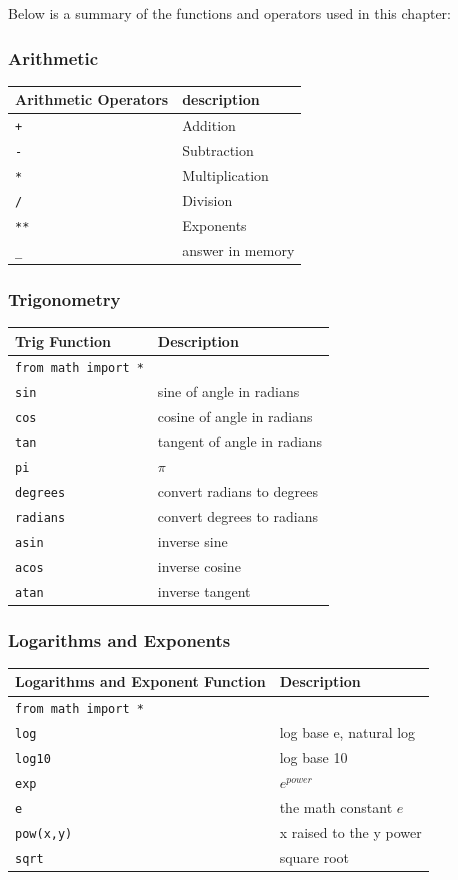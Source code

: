 \documentclass{book}
\begin{document}
Below is a summary of the functions and operators used in this chapter:

\subsubsection{Arithmetic}\label{arithmetic}

\begin{longtable}[]{@{}ll@{}}
\toprule
Arithmetic Operators & description\tabularnewline
\midrule
\endhead
\lstinline!+! & Addition\tabularnewline
\lstinline!-! & Subtraction\tabularnewline
\lstinline!*! & Multiplication\tabularnewline
\lstinline!/! & Division\tabularnewline
\lstinline!**! & Exponents\tabularnewline
\lstinline!_! & answer in memory\tabularnewline
\bottomrule
\end{longtable}

\subsubsection{Trigonometry}\label{trigonometry}

\begin{longtable}[]{@{}ll@{}}
\toprule
Trig Function & Description\tabularnewline
\midrule
\endhead
\lstinline!from math import *! &\tabularnewline
\lstinline!sin! & sine of angle in radians\tabularnewline
\lstinline!cos! & cosine of angle in radians\tabularnewline
\lstinline!tan! & tangent of angle in radians\tabularnewline
\lstinline!pi! & \(\pi\)\tabularnewline
\lstinline!degrees! & convert radians to degrees\tabularnewline
\lstinline!radians! & convert degrees to radians\tabularnewline
\lstinline!asin! & inverse sine\tabularnewline
\lstinline!acos! & inverse cosine\tabularnewline
\lstinline!atan! & inverse tangent\tabularnewline
\bottomrule
\end{longtable}

\subsubsection{Logarithms and Exponents}\label{logarithms-and-exponents}

\begin{longtable}[]{@{}ll@{}}
\toprule
Logarithms and Exponent Function & Description\tabularnewline
\midrule
\endhead
\lstinline!from math import *! &\tabularnewline
\lstinline!log! & log base e, natural log\tabularnewline
\lstinline!log10! & log base 10\tabularnewline
\lstinline!exp! & \(e^{power}\)\tabularnewline
\lstinline!e! & the math constant \(e\)\tabularnewline
\lstinline!pow(x,y)! & x raised to the y power\tabularnewline
\lstinline!sqrt! & square root\tabularnewline
\bottomrule
\end{longtable}
\end{document}
